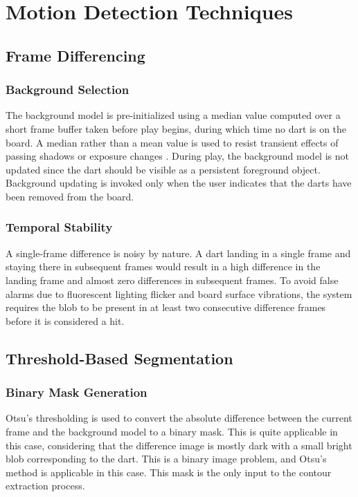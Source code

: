 \vspace{\baselineskip}

\section{Motion Detection Techniques}

\subsection{Frame Differencing}

\subsubsection{Background Selection}
The background model is pre-initialized using a median value computed over a short frame buffer taken before play begins, during which time no dart is on the board. A median rather than a mean value is used to resist transient effects of passing shadows or exposure changes \cite{Stauffer1999}. During play, the background model is not updated since the dart should be visible as a persistent foreground object. Background updating is invoked only when the user indicates that the darts have been removed from the board.

\subsubsection{Temporal Stability}
A single-frame difference is noisy by nature. A dart landing in a single frame and staying there in subsequent frames would result in a high difference in the landing frame and almost zero differences in subsequent frames. To avoid false alarms due to fluorescent lighting flicker and board surface vibrations, the system requires the blob to be present in at least two consecutive difference frames before it is considered a hit.


\subsection{Threshold-Based Segmentation}

\subsubsection{Binary Mask Generation}
Otsu's thresholding is used to convert the absolute difference between the current frame and the background model to a binary mask. This is quite applicable in this case, considering that the difference image is mostly dark with a small bright blob corresponding to the dart. This is a binary image problem, and Otsu's method is applicable in this case. This mask is the only input to the contour extraction process.

